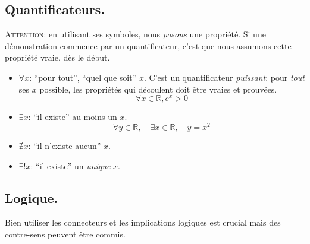 \documentclass[12pt]{article}
\begin{document}
\subsection{Quantificateurs.}
\textsc{Attention}: en utilisant ses symboles, nous \textit{posons} une propriété.
Si une démonstration commence par un quantificateur, 
c'est que nous assumons cette propriété vraie, dès le début.

\begin{itemize}
    \item[\Ii] $\forall x$: \enquote{pour tout}, \enquote{quel que soit} $x$. 
        C'est un quantificateur \textit{puissant}:
        pour \textit{tout} ses $x$ possible, les propriétés qui découlent 
        doit être vraies et prouvées. \\
        \Ex 
        \begin{equation}    
            \forall x \in \mathbb{R}, e^x > 0
        \end{equation}
        
    \item[\Ii] $\exists x$: \enquote{il existe} au moins un $x$. \\
        \Ex 
        \begin{equation}
            \forall y \in \mathbb{R}, \quad 
            \exists x \in \mathbb{R}, \quad
            y = x^2
        \end{equation}

    \item $\nexists x$: \enquote{il n'existe aucun} $x$. 
    \item $\exists! x$: \enquote{il existe} un \textit{unique} $x$.
\end{itemize}


\subsection{Logique.}
Bien utiliser les connecteurs et les implications logiques
est crucial mais des contre-sens peuvent être commis.
\end{document}
